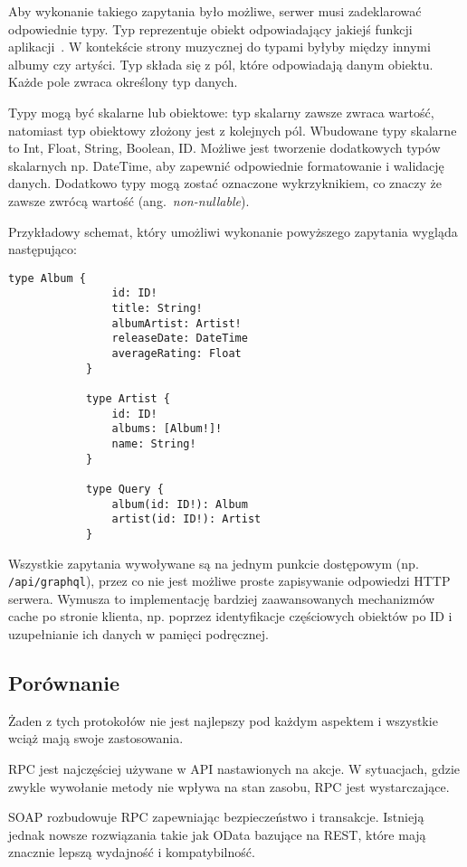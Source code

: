 		Aby wykonanie takiego zapytania było możliwe, serwer musi zadeklarować odpowiednie typy.
		Typ reprezentuje obiekt odpowiadający jakiejś funkcji aplikacji~\cite{GraphQL}.
		W kontekście strony muzycznej do typami byłyby między innymi albumy czy artyści.
		Typ składa się z pól, które odpowiadają danym obiektu.
		Każde pole zwraca określony typ danych.

		Typy mogą być skalarne lub obiektowe: typ skalarny zawsze zwraca wartość, natomiast typ obiektowy złożony jest z kolejnych pól.
		Wbudowane typy skalarne to Int, Float, String, Boolean, ID.
		Możliwe jest tworzenie dodatkowych typów skalarnych np. DateTime, aby zapewnić odpowiednie formatowanie i walidację danych.
		Dodatkowo typy mogą zostać oznaczone wykrzyknikiem, co znaczy że zawsze zwrócą wartość (ang.\ \emph{non-nullable}).
		
		Przykładowy schemat, który umożliwi wykonanie powyższego zapytania wygląda następująco:
		
		\begin{lstlisting}[label=lst:gqlSchema]
			type Album {
				id: ID!
				title: String!
				albumArtist: Artist!
				releaseDate: DateTime
				averageRating: Float
			}

			type Artist {
				id: ID!
				albums: [Album!]!
				name: String!
			}

			type Query {
				album(id: ID!): Album
				artist(id: ID!): Artist
			}
		\end{lstlisting}

		Wszystkie zapytania wywoływane są na jednym punkcie dostępowym (np. \verb|/api/graphql|),
		przez co nie jest możliwe proste zapisywanie odpowiedzi HTTP serwera.
		Wymusza to implementację bardziej zaawansowanych mechanizmów cache po stronie klienta,
		np. poprzez identyfikacje częściowych obiektów po ID i uzupełnianie ich danych w pamięci podręcznej.

	\subsection{Porównanie}
		Żaden z tych protokołów nie jest najlepszy pod każdym aspektem i wszystkie wciąż mają swoje zastosowania.

		RPC jest najczęściej używane w API nastawionych na akcje.
		W sytuacjach, gdzie zwykle wywołanie metody nie wpływa na stan zasobu, RPC jest wystarczające.

		SOAP rozbudowuje RPC zapewniając bezpieczeństwo i transakcje.
		Istnieją jednak nowsze rozwiązania takie jak OData bazujące na REST, które mają znacznie lepszą wydajność i kompatybilność.

